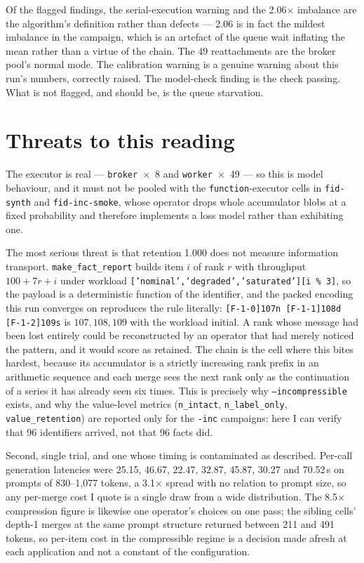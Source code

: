 \documentclass[11pt]{article}
\begin{document}
Of the flagged findings, the serial-execution warning and the 2.06$\times$ imbalance are the
algorithm's definition rather than defects --- 2.06 is in fact the mildest imbalance in the
campaign, which is an artefact of the queue wait inflating the mean rather than a virtue of
the chain. The 49 reattachments are the broker pool's normal mode. The calibration warning
is a genuine warning about this run's numbers, correctly raised. The model-check finding is
the check passing. What is not flagged, and should be, is the queue starvation.

\section{Threats to this reading}

The executor is real --- \texttt{broker}~$\times$~8 and \texttt{worker}~$\times$~49 --- so
this is model behaviour, and it must not be pooled with the \texttt{function}-executor
cells in \texttt{fid-synth} and \texttt{fid-inc-smoke}, whose operator drops whole
accumulator blobs at a fixed probability and therefore implements a loss model rather than
exhibiting one.

The most serious threat is that retention 1.000 does not measure information transport.
\texttt{make\_fact\_report} builds item $i$ of rank $r$ with throughput $100 + 7r + i$ under
workload \texttt{['nominal','degraded','saturated'][i \% 3]}, so the payload is a
deterministic function of the identifier, and the packed encoding this run converges on
reproduces the rule literally: \texttt{[F-1-0]107n [F-1-1]108d [F-1-2]109s} is $107, 108,
109$ with the workload initial. A rank whose message had been lost entirely could be
reconstructed by an operator that had merely noticed the pattern, and it would score as
retained. The chain is the cell where this bites hardest, because its accumulator is a
strictly increasing rank prefix in an arithmetic sequence and each merge sees the next rank
only as the continuation of a series it has already seen six times. This is precisely why
\texttt{--incompressible} exists, and why the value-level metrics
(\texttt{n\_intact}, \texttt{n\_label\_only}, \texttt{value\_retention}) are reported only
for the \texttt{-inc} campaigns: here I can verify that 96 identifiers arrived, not that 96
facts did.

Second, single trial, and one whose timing is contaminated as described. Per-call
generation latencies were 25.15, 46.67, 22.47, 32.87, 45.87, 30.27 and 70.52\,s on prompts
of 830--1{,}077 tokens, a 3.1$\times$ spread with no relation to prompt size, so any
per-merge cost I quote is a single draw from a wide distribution. The 8.5$\times$
compression figure is likewise one operator's choices on one pass; the sibling cells'
depth-1 merges at the same prompt structure returned between 211 and 491 tokens, so
per-item cost in the compressible regime is a decision made afresh at each application and
not a constant of the configuration.
\end{document}
